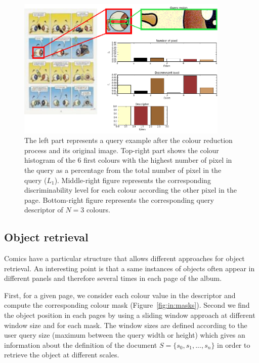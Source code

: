  \begin{figure}[!ht]	%
 	 \centering
 	\includegraphics[width=0.9\textwidth]{description_sequence.png}
 	\caption[Comic character query description]{The left part represents a query example after the colour reduction process and its original image. Top-right part shows the colour histogram of the 6 first colours with the highest number of pixel in the query as a percentage from the total number of pixel in the query ($L_1$). Middle-right figure represents the corresponding discriminability level for each colour according the other pixel in the page. Bottom-right figure represents the corresponding query descriptor of $N=3$ colours.}
 	\label{fig:in:dominant_colour_hist_desc}
 \end{figure}


\subsection{Object retrieval}
Comics have a particular structure that allows different approaches for object retrieval. An interesting point is that a same instances of objects often appear in different panels and therefore several times in each page of the album.

First, for a given page, we consider each colour value in the descriptor and compute the corresponding colour mask (Figure~\ref{fig:in:masks}). %
Second we find the object position in each pages by using a sliding window approach at different window size and for each mask. The window sizes are defined according to the user query size (maximum between the query width or height) which gives an information about the definition of the document $S=\{s_0,s_1,...,s_n\}$ in order to retrieve the object at different scales.

